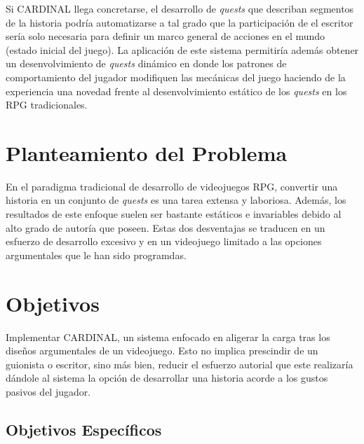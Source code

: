 Si CARDINAL llega concretarse, el desarrollo de \textit{quests} que describan segmentos de la historia podría automatizarse a tal grado que la participación de el escritor sería solo necesaria para definir un marco general de acciones en el mundo (estado inicial del juego). La aplicación de este sistema permitiría además obtener un desenvolvimiento de \textit{quests} dinámico en donde los patrones de comportamiento del jugador modifiquen las mecánicas del juego haciendo de la experiencia una novedad frente al desenvolvimiento estático de los \textit{quests} en los \ac{RPG} tradicionales.
 

\section{Planteamiento del Problema}

En el paradigma tradicional de desarrollo de videojuegos RPG, convertir una historia en un conjunto de \textit{quests} es una tarea extensa y laboriosa. Además, los resultados de este enfoque suelen ser  bastante estáticos e invariables debido al alto grado de autoría que poseen. Estas dos desventajas se traducen en un esfuerzo de desarrollo excesivo y en un videojuego limitado a las opciones argumentales que le han sido programdas. 


\section{Objetivos}


Implementar CARDINAL, un sistema enfocado en aligerar la carga tras los diseños argumentales de un videojuego. Esto no implica prescindir de un guionista o escritor, sino más bien, reducir el esfuerzo autorial que este realizaría dándole al sistema la opción de desarrollar una historia acorde a los gustos pasivos del jugador.


\subsection{Objetivos Específicos}


